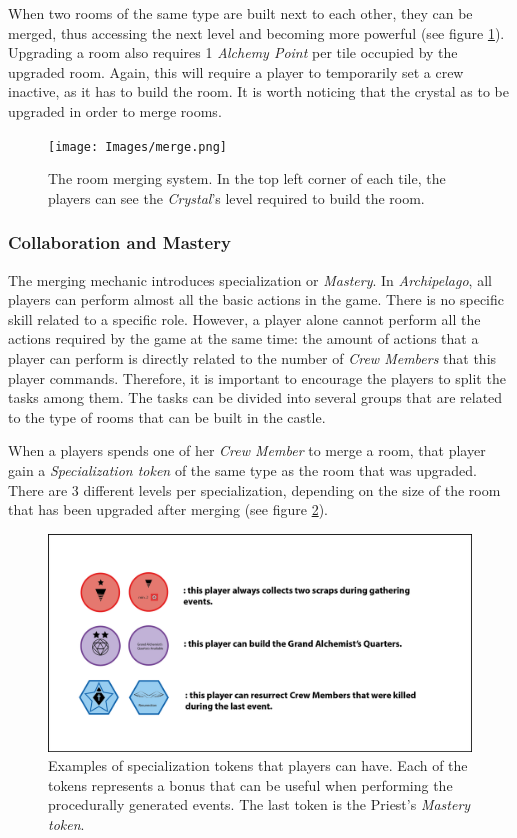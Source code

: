 When two rooms of the same type are built next to each other, they can be merged, thus accessing the next level and becoming more powerful (see figure \ref{fig:merge}). Upgrading a room also requires 1 \textit{Alchemy Point} per tile occupied by the upgraded room. Again, this will require a player to temporarily set a crew inactive, as it has to build the room. It is worth noticing that the crystal as to be upgraded in order to merge rooms.

\begin{figure}[!ht]
    \centering
    \texttt{[image: Images/merge.png]}
    \caption{The room merging system. In the top left corner of each tile, the players can see the \textit{Crystal}'s level required to build the room.} 
    \label{fig:merge}
\end{figure}
\subsubsection{Collaboration and Mastery}
The merging mechanic introduces specialization or \textit{Mastery}. In \textit{Archipelago}, all players can perform almost all the basic actions in the game. There is no specific skill related to a specific role. However, a player alone cannot perform all the actions required by the game at the same time: the amount of actions that a player can perform is directly related to the number of \textit{Crew Members} that this player commands. Therefore, it is important to encourage the players to split the tasks among them. The tasks can be divided into several groups that are related to the type of rooms that can be built in the castle. 

When a players spends one of her \textit{Crew Member} to merge a room, that player gain a \textit{Specialization token} of the same type as the room that was upgraded. There are 3 different levels per specialization, depending on the size of the room that has been upgraded after merging (see figure \ref{fig:spec}). 

\begin{figure}[!ht]
    \centering
    \includegraphics[width=\textwidth]{Images/Specialization.png}
    \caption{Examples of specialization tokens that players can have. Each of the tokens represents a bonus that can be useful when performing the procedurally generated events. The last token is the Priest's \textit{Mastery token}.}
    \label{fig:spec}
\end{figure}

